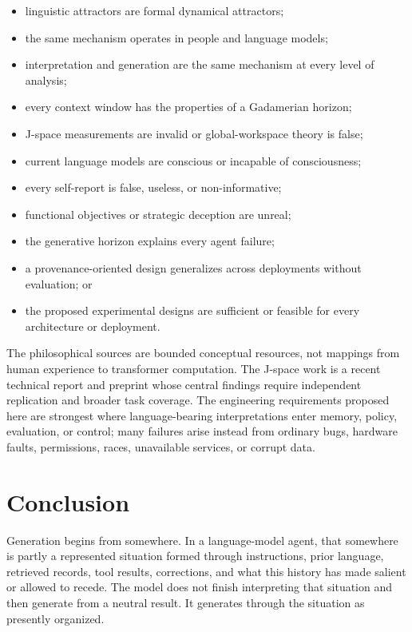 \documentclass[12pt]{article}
\providecommand{\tightlist}{%
  \setlength{\itemsep}{0pt}\setlength{\parskip}{0pt}}
\begin{document}
\begin{itemize}
\tightlist
\item
  linguistic attractors are formal dynamical attractors;
\item
  the same mechanism operates in people and language models;
\item
  interpretation and generation are the same mechanism at every level of analysis;
\item
  every context window has the properties of a Gadamerian horizon;
\item
  J-space measurements are invalid or global-workspace theory is false;
\item
  current language models are conscious or incapable of consciousness;
\item
  every self-report is false, useless, or non-informative;
\item
  functional objectives or strategic deception are unreal;
\item
  the generative horizon explains every agent failure;
\item
  a provenance-oriented design generalizes across deployments without evaluation; or
\item
  the proposed experimental designs are sufficient or feasible for every architecture or deployment.
\end{itemize}

The philosophical sources are bounded conceptual resources, not mappings from human experience to transformer computation. The J-space work is a recent technical report and preprint whose central findings require independent replication and broader task coverage. The engineering requirements proposed here are strongest where language-bearing interpretations enter memory, policy, evaluation, or control; many failures arise instead from ordinary bugs, hardware faults, permissions, races, unavailable services, or corrupt data.

\section{Conclusion}\label{conclusion}

Generation begins from somewhere. In a language-model agent, that somewhere is partly a represented situation formed through instructions, prior language, retrieved records, tool results, corrections, and what this history has made salient or allowed to recede. The model does not finish interpreting that situation and then generate from a neutral result. It generates through the situation as presently organized.
\end{document}
